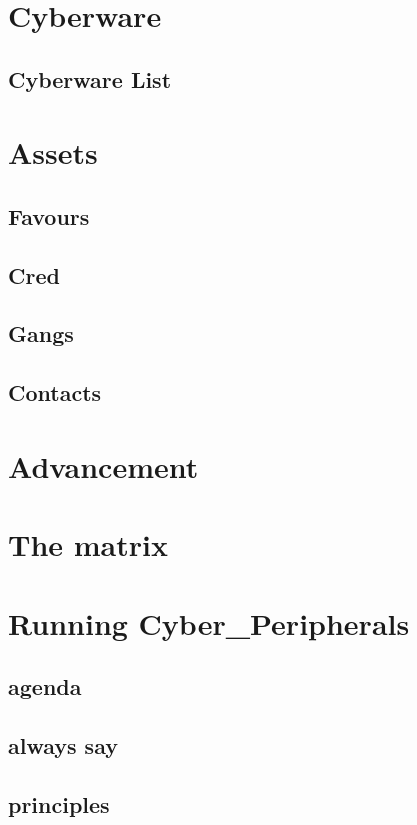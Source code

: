 \documentclass{tufte-book}
\begin{document}
\chapter{Cyberware} \label{ch:cyberware}
\section{Cyberware List} \label{sec: Cyberware list}

\chapter{Assets} 	\label{ch:assets}
\section {Favours}	\label{sec:favours}
\section {Cred} 	\label{sec:cred}
\section {Gangs}	\label{sec: gangs}
\section {Contacts}	\label{sec: contacts}

\chapter{Advancement}	\label{ch: advancement}
\chapter{The matrix}	\label{ch: the matrix}
\chapter{Running Cyber\_Peripherals}	\label{ch:running the game}
\section{agenda}			\label{sec: agenda}
\section{always say}		\label{sec: always say}
\section{principles}			\label{sec: principles}
\end{document}
